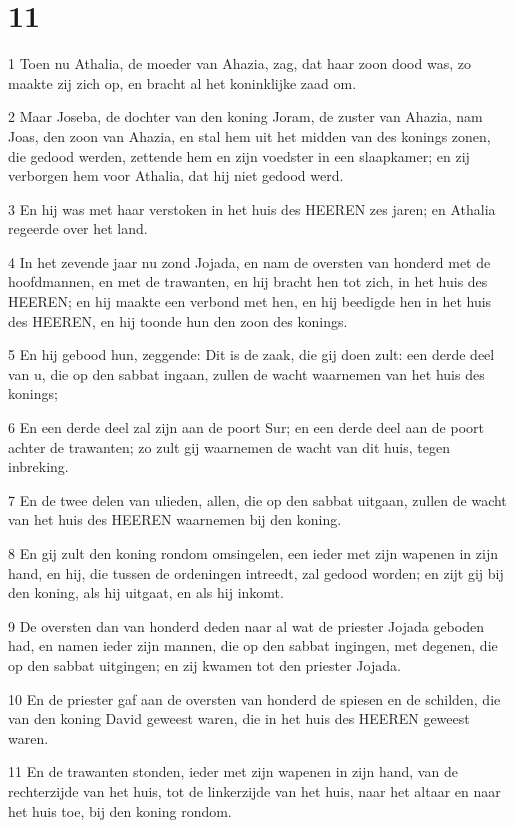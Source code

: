 \chapter{11}

\par 1 Toen nu Athalia, de moeder van Ahazia, zag, dat haar zoon dood was, zo maakte zij zich op, en bracht al het koninklijke zaad om.
\par 2 Maar Joseba, de dochter van den koning Joram, de zuster van Ahazia, nam Joas, den zoon van Ahazia, en stal hem uit het midden van des konings zonen, die gedood werden, zettende hem en zijn voedster in een slaapkamer; en zij verborgen hem voor Athalia, dat hij niet gedood werd.
\par 3 En hij was met haar verstoken in het huis des HEEREN zes jaren; en Athalia regeerde over het land.
\par 4 In het zevende jaar nu zond Jojada, en nam de oversten van honderd met de hoofdmannen, en met de trawanten, en hij bracht hen tot zich, in het huis des HEEREN; en hij maakte een verbond met hen, en hij beedigde hen in het huis des HEEREN, en hij toonde hun den zoon des konings.
\par 5 En hij gebood hun, zeggende: Dit is de zaak, die gij doen zult: een derde deel van u, die op den sabbat ingaan, zullen de wacht waarnemen van het huis des konings;
\par 6 En een derde deel zal zijn aan de poort Sur; en een derde deel aan de poort achter de trawanten; zo zult gij waarnemen de wacht van dit huis, tegen inbreking.
\par 7 En de twee delen van ulieden, allen, die op den sabbat uitgaan, zullen de wacht van het huis des HEEREN waarnemen bij den koning.
\par 8 En gij zult den koning rondom omsingelen, een ieder met zijn wapenen in zijn hand, en hij, die tussen de ordeningen intreedt, zal gedood worden; en zijt gij bij den koning, als hij uitgaat, en als hij inkomt.
\par 9 De oversten dan van honderd deden naar al wat de priester Jojada geboden had, en namen ieder zijn mannen, die op den sabbat ingingen, met degenen, die op den sabbat uitgingen; en zij kwamen tot den priester Jojada.
\par 10 En de priester gaf aan de oversten van honderd de spiesen en de schilden, die van den koning David geweest waren, die in het huis des HEEREN geweest waren.
\par 11 En de trawanten stonden, ieder met zijn wapenen in zijn hand, van de rechterzijde van het huis, tot de linkerzijde van het huis, naar het altaar en naar het huis toe, bij den koning rondom.
